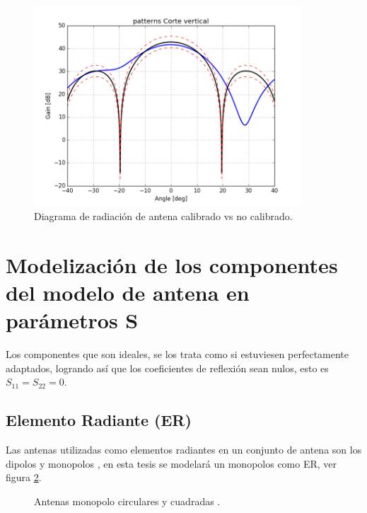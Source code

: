 \begin{figure}[H]
 \centering
 \includegraphics[width=10cm]{gfx/nonCalPattern.png}
 \caption{Diagrama de radiación de antena calibrado vs no calibrado.}
 \label{fig:nonCalPattern}
\end{figure}


\section{Modelización de los componentes del modelo de antena en parámetros S}

Los componentes que son ideales, se los trata como si estuviesen perfectamente adaptados, logrando así que los coeficientes
de reflexión sean nulos, esto es $S_{11} = S_{22} = 0$. 


\subsection{Elemento Radiante (ER)}

Las antenas utilizadas como elementos radiantes en un conjunto de antena son los dipolos y monopolos \cite{Balanis2012}, en esta
tesis se modelará un monopolos como ER, ver figura \ref{fig:radiatingElement}.
\begin{figure}[H]
	\centering
		\caption{Antenas monopolo circulares y cuadradas \cite{Balanis2012}.}
	\label{fig:radiatingElement}
\end{figure}


